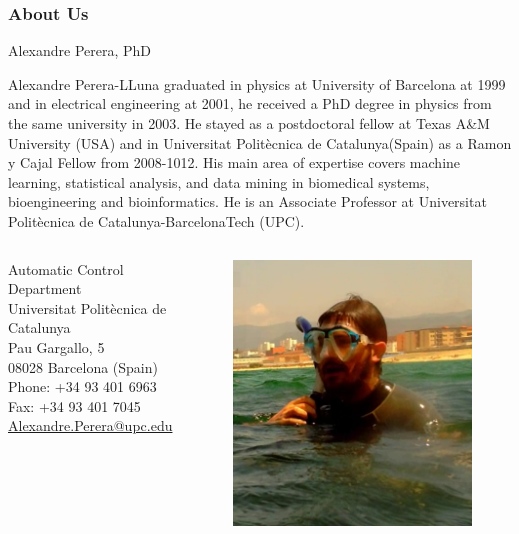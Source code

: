 \documentclass[colorlinks,10pt]{beamer}
\begin{document}
\begin{frame}[plain]\frametitle{About Us}

\begin{block}{Alexandre Perera, PhD}

    \small Alexandre Perera-LLuna graduated in physics at University of Barcelona at 1999 and in electrical engineering at 2001, he received a PhD degree in physics from the same university in 2003. He stayed as a postdoctoral fellow at Texas A\&M University (USA) and in Universitat Politècnica de Catalunya(Spain) as a Ramon y Cajal Fellow from 2008-1012. His main area of expertise covers machine learning, statistical analysis, and data mining in biomedical systems, bioengineering and bioinformatics. He is an Associate Professor at Universitat Politècnica de Catalunya-BarcelonaTech (UPC).
\end{block}
\begin{columns}[c]
Automatic Control Department\\
Universitat Politècnica de Catalunya\\
Pau Gargallo, 5\\
08028 Barcelona (Spain)\\
Phone: +34 93 401 6963\\
Fax: +34 93 401 7045\\
\href{Alexandre.Perera@upc.edu}{Alexandre.Perera@upc.edu}

 
\begin{figure}[!htb]
    \centering
    \includegraphics[width=\textwidth]{figs/alex1}
\end{figure}
\end{columns}
\end{frame}
\end{document}

